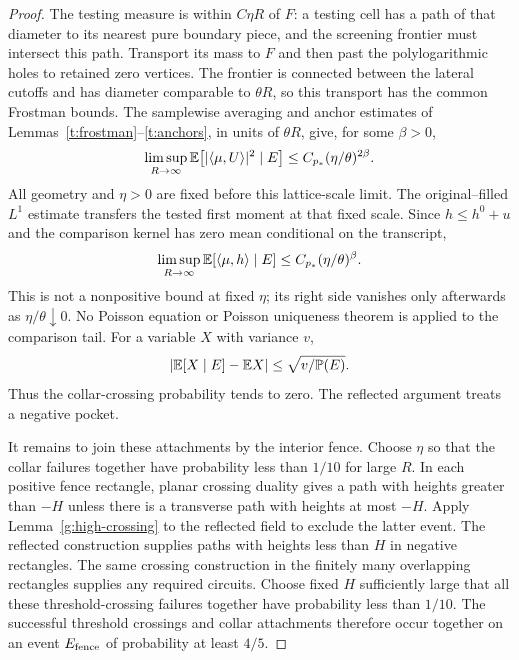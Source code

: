 \begin{proof}
The testing measure is within $C\eta R$ of $F$: a testing cell has
a path of that diameter to its nearest pure boundary piece, and the
screening frontier must intersect this path. Transport its mass to
$F$ and then past the polylogarithmic holes to retained zero vertices.
The frontier is connected between the lateral cutoffs and has diameter
comparable to $\theta R$, so this transport has the common Frostman
bounds. The samplewise averaging and anchor estimates of
Lemmas~\ref{t:frostman}--\ref{t:anchors}, in units of $\theta R$,
give, for some $\beta>0$,
\[
 \limsup_{R\to\infty}
 \mathbb E\bigl[|\langle\mu,U\rangle|^2\mid E\bigr]
 \le C_{p_*}(\eta/\theta)^{2\beta}.
\]
All geometry and $\eta>0$ are fixed before this lattice-scale limit.
The original--filled $L^1$ estimate transfers the tested first moment
at that fixed scale. Since $h\le h^0+u$ and the comparison kernel has
zero mean conditional on the transcript,
\[
 \limsup_{R\to\infty}\mathbb E[\langle\mu,h\rangle\mid E]
 \le C_{p_*}(\eta/\theta)^\beta.
\]
This is not a nonpositive bound at fixed $\eta$; its right side vanishes
only afterwards as $\eta/\theta\downarrow0$. No Poisson equation or
Poisson uniqueness theorem is applied to the comparison tail.
For a variable \(X\) with variance \(v\),
\[
 |\mathbb E[X\mid E]-\mathbb E X|\leq\sqrt{v/\mathbb P(E)}.
\]
Thus the collar-crossing probability tends to zero. The reflected
argument treats a negative pocket.

It remains to join these attachments by the interior fence. Choose
\(\eta\) so that the collar failures together have probability less
than \(1/10\) for large \(R\). In each positive fence rectangle,
planar crossing duality gives a path with heights greater than \(-H\)
unless there is a transverse path with heights at most \(-H\).
Apply Lemma~\ref{g:high-crossing} to the reflected field to exclude
the latter event. The reflected construction supplies paths with
heights less than \(H\) in negative rectangles. The same crossing
construction in the finitely many overlapping rectangles supplies
any required circuits. Choose fixed \(H\) sufficiently large that
all these threshold-crossing failures together have probability less
than \(1/10\). The successful threshold crossings and collar attachments
therefore occur together on an event \(E_{\rm fence}\) of probability
at least \(4/5\).


\end{proof}
